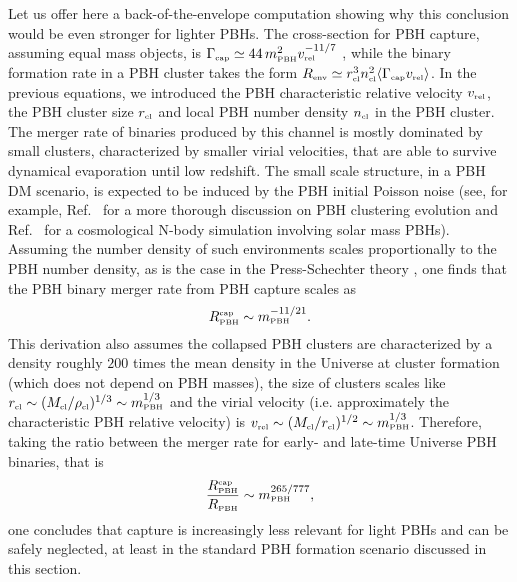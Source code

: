 \documentclass[11pt,a4paper]{article}
\newcommand{\PBH}{\text{\tiny PBH}}
\begin{document}
Let us offer here a back-of-the-envelope computation showing why this conclusion would be even stronger for lighter PBHs. 
The cross-section for PBH capture, assuming equal mass objects, is 
$\Gamma_\text{\tiny cap} \simeq 44 \, m_\PBH^2  v_\text{\tiny rel}^{{-11/7}}$ \cite{1989ApJ...343..725Q,Mouri:2002mc}, 
while the binary formation rate in a PBH cluster takes the form $R_\text{\tiny env} \simeq r^3_\text{\tiny cl} n_\text{\tiny cl}^2 \langle  \Gamma_\text{\tiny cap} v_\text{\tiny rel}\rangle$. 
In the previous equations, we introduced the PBH characteristic relative velocity $v_\text{\tiny rel}$, the PBH cluster size $r_\text{\tiny cl}$ and local PBH number density $n_\text{\tiny cl}$ in the PBH cluster.
The merger rate of binaries produced by this channel is mostly dominated by small clusters, characterized by smaller virial velocities, that are able to survive dynamical evaporation until low redshift. 
The small scale structure, in a PBH DM scenario, is expected to be induced by the PBH initial Poisson noise (see, for example, Ref.~\cite{DeLuca:2020jug} for a more thorough discussion on PBH clustering evolution and Ref.~\cite{Inman:2019wvr} for a cosmological N-body simulation involving solar mass PBHs). Assuming the number density of such environments scales proportionally to the PBH number density, as is the case in the Press-Schechter theory \cite{1974ApJ...187..425P}, one finds that the PBH binary merger rate from PBH capture scales as
\begin{equation}
R_\text{\tiny PBH}^\text{\tiny cap} \sim m_\text{\tiny PBH}^{-11/21}.
\end{equation}
This derivation also assumes the collapsed PBH clusters are characterized by a density roughly $200$ times the mean density in the Universe at cluster formation (which does not depend on PBH masses), the size of clusters scales like $r_\text{\tiny cl} \sim  (M_\text{\tiny cl} / \rho_\text{\tiny cl})^{1/3}\sim m_\PBH^{1/3}$ and the virial velocity (i.e. approximately the characteristic PBH relative velocity) is $v_\text{\tiny rel} \sim (M_\text{\tiny cl}/r_\text{\tiny cl})^{1/2} \sim m_\text{\tiny PBH}^{1/3}$.
Therefore, taking the ratio between the merger rate for early-  and late-time Universe PBH binaries, that is 
\begin{equation}
\frac{R_\text{\tiny PBH}^\text{\tiny cap} }{R_\text{\tiny PBH}}  \sim m_\PBH^{265/777},
\end{equation}
one concludes  that capture is increasingly less relevant for light PBHs and can be safely neglected, at least in the standard PBH formation scenario discussed in this section. 
\end{document}
